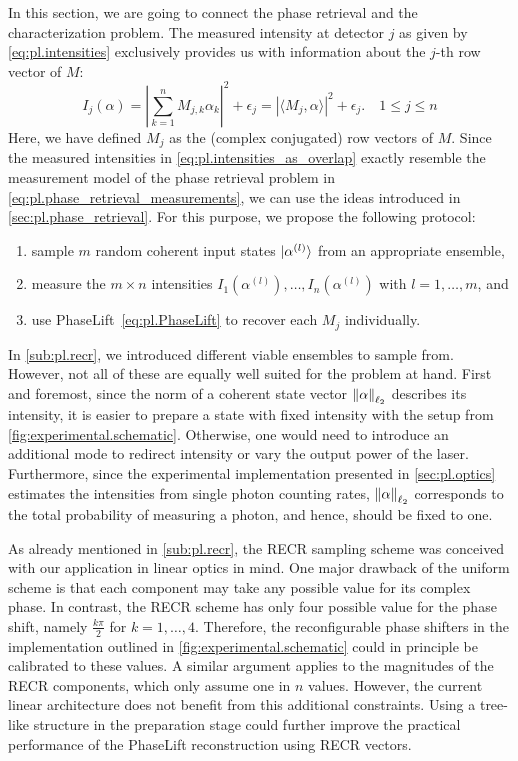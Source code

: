 In this section, we are going to connect the phase retrieval and the characterization problem.
The measured intensity at detector $j$ as given by \cref{eq:pl.intensities} exclusively provides us with information about the $j$-th row vector of ${M}$:
\[
  I_j({\alpha})
  = \left| \sum_{k=1}^n M_{j,k} \alpha_k \right|^2 + \epsilon_j
  = \left\vert  \langle {M}_j, \alpha \rangle  \right\vert^2 + \epsilon_j. \quad 1 \leq j \leq n
  \label{eq:pl.intensities_as_overlap}
\]
Here, we have defined ${M}_j$ as the (complex conjugated) row vectors of ${M}$.
Since the measured intensities in \cref{eq:pl.intensities_as_overlap} exactly resemble the measurement model of the phase retrieval problem in \cref{eq:pl.phase_retrieval_measurements}, we can use the ideas introduced in \cref{sec:pl.phase_retrieval}.
For this purpose, we propose the following protocol:
\begin{enumerate}
  \item sample $m$ random coherent input states $\ket{ \alpha^{(l)}}$ from an appropriate ensemble,
  \item measure the $m \times n$ intensities $I_1(\alpha^{(l)}), \ldots, I_n ( \alpha^{(l)})$ with $l=1,\ldots,m$, and
  \item use PhaseLift~\eqref{eq:pl.PhaseLift} to recover each ${M}_j$ individually.
\end{enumerate}

In \cref{sub:pl.recr}, we introduced different viable ensembles to sample from.
However, not all of these are equally well suited for the problem at hand.
First and foremost, since the norm of a coherent state vector ${\Vert\alpha\Vert}_{\ell_2}$ describes its intensity, it is easier to prepare a state with fixed intensity with the setup from \cref{fig:experimental.schematic}.
Otherwise, one would need to introduce an additional mode to redirect  intensity or vary the output power of the laser.
Furthermore, since the experimental implementation presented in \cref{sec:pl.optics} estimates the intensities from single photon counting rates, ${\Vert\alpha\Vert}_{\ell_2}$ corresponds to the total probability of measuring a photon, and hence, should be fixed to one.

As already mentioned in \cref{sub:pl.recr}, the RECR sampling scheme was conceived with our application in linear optics in mind.
One major drawback of the uniform scheme is that each component may take any possible value for its complex phase.
In contrast, the RECR scheme has only four possible value for the phase shift, namely $\frac{k \pi}{2}$ for $k=1,\ldots,4$.
Therefore, the reconfigurable phase shifters in the implementation outlined in \cref{fig:experimental.schematic} could in principle be calibrated to these values.
A similar argument applies to the magnitudes of the RECR components, which only assume one in $n$ values.
However, the current linear architecture does not benefit from this additional constraints.
Using a tree-like structure in the preparation stage could further improve the practical performance of the PhaseLift reconstruction using RECR vectors.\\



